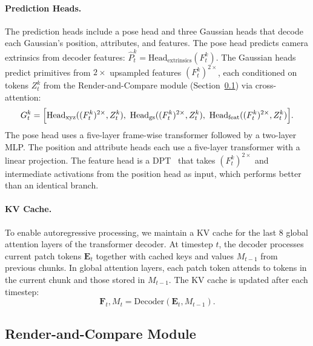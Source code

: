\documentclass[runningheads]{llncs}
\begin{document}
\vspace{-2mm} \paragraph{\textbf{Prediction Heads}.}
The prediction heads include a pose head and three Gaussian heads that decode each Gaussian’s position, attributes, and features. 
The pose head predicts camera extrinsics from decoder features: $\hat{P}_t^k = \text{Head}_\text{extrinsics}(F_t^k)$. 
The Gaussian heads predict primitives from $2\times$ upsampled features $(F_t^k)^{2\times}$, each conditioned on tokens $Z_t^k$ from the Render-and-Compare module (Section~\ref{sec:render-and-compare}) via cross-attention:
\begin{equation}
G_t^k = \Bigl[\text{Head}_\text{xyz}((F_t^k)^{2\times}, Z_t^k),\ 
\text{Head}_\text{gs}((F_t^k)^{2\times}, Z_t^k),\ 
\text{Head}_\text{feat}((F_t^k)^{2\times}, Z_t^k)\Bigr].
\end{equation}
The pose head uses a five-layer frame-wise transformer followed by a two-layer MLP. 
The position and attribute heads each use a five-layer transformer with a linear projection. 
The feature head is a DPT~\cite{Ranftl_2021_ICCV} that takes $(F_t^k)^{2\times}$ and intermediate activations from the position head as input, which performs better than an identical branch.

\vspace{-2mm} \paragraph{\textbf{KV Cache.}} 

To enable autoregressive processing, we maintain a KV cache for the last $8$ global attention layers of the transformer decoder. 
At timestep $t$, the decoder processes current patch tokens $\mathbf{E}_t$ together with cached keys and values $M_{t-1}$ from previous chunks.
In global attention layers, each patch token attends to tokens in the current chunk and those stored in $M_{t-1}$.
The KV cache is updated after each timestep:
\begin{equation}
    \mathbf{F}_t, M_t = \text{Decoder}(\mathbf{E}_t, M_{t - 1}).
\end{equation}

\subsection{Render-and-Compare Module} 
\label{sec:render-and-compare}
\end{document}

